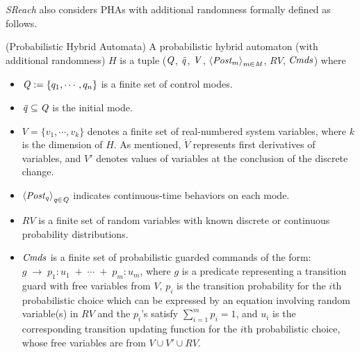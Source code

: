 \vspace{-.4cm}
{\it SReach} also considers PHAs with additional randomness formally defined as follows.
\vspace{-.4cm}
\begin{definition}
\label{def:pha}
{\rm(Probabilistic Hybrid Automata)} A probabilistic hybrid automaton  (with additional randomness) $H$ is a tuple (${\it Q}$, ${\it \bar{q}}$, ${\it V}$, ${\it \left \langle Post_m \right \rangle_{m \in M}}$, $RV$, ${\it Cmds}$) where
\vspace{-.4cm}
\begin{itemize}
\item ${\it Q} := \{ q_1, \cdots, q_n \}$ is a finite set of control modes.
\vspace{-.2cm}
\item ${\it \bar{q}} \subseteq {\it Q}$ is the initial mode.
\vspace{-.2cm}
\item $V = \{ v_1, \cdots, v_k \}$ denotes a finite set of real-numbered system variables, where $k$ is the dimension of $H$. As mentioned, $\dot{V}$ represents first derivatives of variables, and $V'$ denotes values of variables at the conclusion of the discrete change.
\vspace{-.2cm}
\item ${\it \left \langle Post_q \right \rangle_{q \in Q}}$ indicates continuous-time behaviors on each mode. 
\vspace{-.2cm}
\item $RV$ is a finite set of random variables with known discrete or continuous probability distributions.
\vspace{-.2cm}
\item ${\it Cmds}$ is a finite set of probabilistic guarded commands of the form: 
$g \; \rightarrow \; p_1:u_1 \; + \; \cdots \; + \; p_m:u_m$,
where $g$ is a predicate representing a transition guard with free variables from $V$, $p_i$ is the transition probability for the $i$th probabilistic choice which can be expressed by an equation involving random variable(s) in $RV$ 
and the $p_i$'s satisfy $\sum_{i=1}^m p_i =1$, and $u_i$ is the corresponding transition updating function for the $i$th probabilistic choice, whose free variables are from $V \cup V' \cup RV$.
\end{itemize}
\end{definition}
\vspace{-.4cm}
